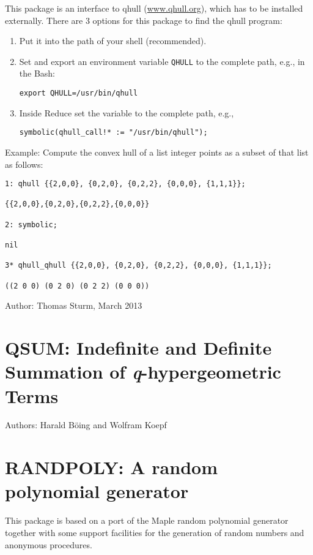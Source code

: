 This package is an interface to qhull (\href{http://www.qhull.org}{www.qhull.org}),
which has to be installed externally.  There are 3 options for this
package to find the qhull program:
\begin{enumerate}
\item Put it into the path of your shell (recommended).
\item Set and export an environment variable \texttt{QHULL} to the complete path, e.g., in
the Bash:
\begin{verbatim}
export QHULL=/usr/bin/qhull
\end{verbatim}
\item Inside Reduce set the variable  to the complete path, e.g.,
\begin{verbatim}
symbolic(qhull_call!* := "/usr/bin/qhull");
\end{verbatim}
\end{enumerate}
Example:
Compute the convex hull of a list integer points as a subset
of that list as follows:
\begin{verbatim}
1: qhull {{2,0,0}, {0,2,0}, {0,2,2}, {0,0,0}, {1,1,1}};

{{2,0,0},{0,2,0},{0,2,2},{0,0,0}}

2: symbolic;

nil

3* qhull_qhull {{2,0,0}, {0,2,0}, {0,2,2}, {0,0,0}, {1,1,1}};

((2 0 0) (0 2 0) (0 2 2) (0 0 0))
\end{verbatim}

Author: Thomas Sturm, March 2013

\newpage


\section{QSUM: Indefinite and Definite Summation
of \textsl{q}-hypergeometric Terms}

Authors: Harald B\"{o}ing and Wolfram Koepf



\newpage

\section{RANDPOLY: A random polynomial generator}

This package is based on a port of the Maple random polynomial
generator together with some support facilities for the generation
of random numbers and anonymous procedures.

